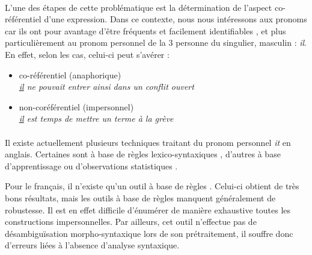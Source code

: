 \documentclass[a4paper,12pt]{article}
\begin{document}
\paragraph{}
L'une des étapes de cette problématique est la détermination de l'aspect co-référentiel d'une expression.
Dans ce contexte, nous nous intéressons aux pronoms car ils ont pour avantage d'être fréquents et facilement identifiables \citep{danlos-ilimp-taln2005}, et plus particulièrement au pronom personnel de la 3 personne du singulier, masculin : \og{}\textit{il}\fg{}. 
En effet, selon les cas, celui-ci peut s'avérer : 
\begin{itemize}
 \item co-référentiel (anaphorique)\\ \og{}\textit{\underline{il} ne pouvait entrer ainsi dans un conflit ouvert}\fg{}
 \item non-coréférentiel (impersonnel)\\ \og{}\textit{\underline{il} est temps de mettre un terme à la grève}\fg{}
\end{itemize}

\paragraph{}
Il existe actuellement plusieurs techniques traitant du pronom personnel \og{}\textit{it}\fg{} en anglais.
Certaines sont à base de règles lexico-syntaxiques \citep{Lappin-1994-APA-203987.203989}, d'autres à base d'apprentissage \citep{Li-2009-IPU-1622716.1622726} ou d'observations statistiques \citep{Bergsma-11}.


Pour le français, il n'existe qu'un outil à base de règles \citep{danlos-ilimp-taln2005}. Celui-ci obtient de très bons résultats, mais les outils à base de règles manquent généralement de robustesse. Il est en effet difficile d'énumérer de manière exhaustive toutes les constructions impersonnelles. Par ailleurs, cet outil n'effectue pas de désambiguïsation morpho-syntaxique lors de son prétraitement, il souffre donc d'erreurs liées à l'absence d'analyse syntaxique.
\end{document}
